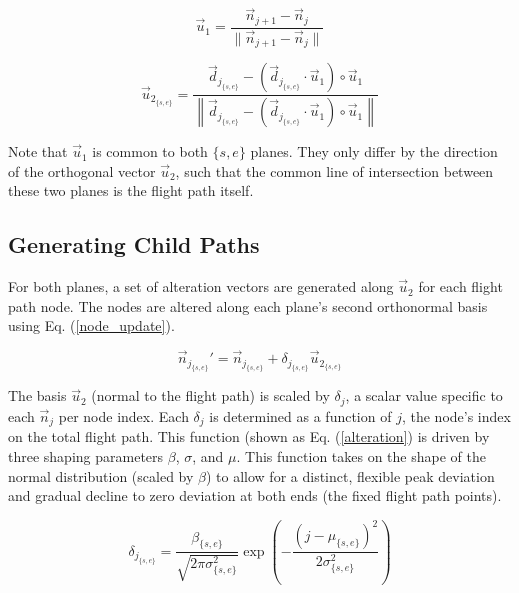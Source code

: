 \documentclass[conf]{new-aiaa}
\begin{document}
\begin{equation}
\label{normal-basis1}
\vec{u}_1 = \frac{\vec{n}_{j + 1} - \vec{n}_j}{\|\vec{n}_{j + 1} - \vec{n}_j\|}
\end{equation}

\begin{equation}
\label{normal-basis2}
\vec{u}_{2_{\{s, e\}}} = \frac{\vec{d}_{j_{\{s, e\}}} - \left(\vec{d}_{j_{\{s, e\}}}{\cdot}\vec{u}_1\right){\circ}\vec{u}_1}{\left\|\vec{d}_{j_{\{s, e\}}} - \left(\vec{d}_{j_{\{s, e\}}}{\cdot}\vec{u}_1\right){\circ}\vec{u}_1\right\|}
\end{equation}

Note that $\vec{u}_1$ is common to both $\{s, e\}$ planes. They only differ by the direction of the orthogonal vector $\vec{u}_2$, such that the common line of intersection between these two planes is the flight path itself.


\subsection{Generating Child Paths}

For both planes, a set of alteration vectors are generated along $\vec{u}_2$ for each flight path node. The nodes are altered along each plane's second orthonormal basis using Eq. (\ref{node_update}).

\begin{equation}
\label{node_update}
\vec{n}_{j_{{\{s, e\}}}}' = \vec{n}_{j_{\{s, e\}}} + \delta_{j_{\{s, e\}}}\vec{u}_{2_{\{s, e\}}}
\end{equation}

The basis $\vec{u}_2$ (normal to the flight path) is scaled by $\delta_j$, a scalar value specific to each $\vec{n}_j$ per node index. Each $\delta_j$ is determined as a function of $j$, the node's index on the total flight path. This function (shown as Eq. (\ref{alteration}) is driven by three shaping parameters $\beta$, $\sigma$, and $\mu$. This function takes on the shape of the normal distribution (scaled by $\beta$) to allow for a distinct, flexible peak deviation and gradual decline to zero deviation at both ends (the fixed flight path points).

\begin{equation}
\label{alteration}
\delta_{j_{\{s, e\}}} = \frac{\beta_{\{s, e\}}}{\sqrt{2\pi\sigma_{\{s, e\}}^2}}\exp\left({-\frac{{\left(j - \mu_{\{s, e\}}\right)}^2}{2\sigma_{\{s, e\}}^2}}\right)
\end{equation}
\end{document}
